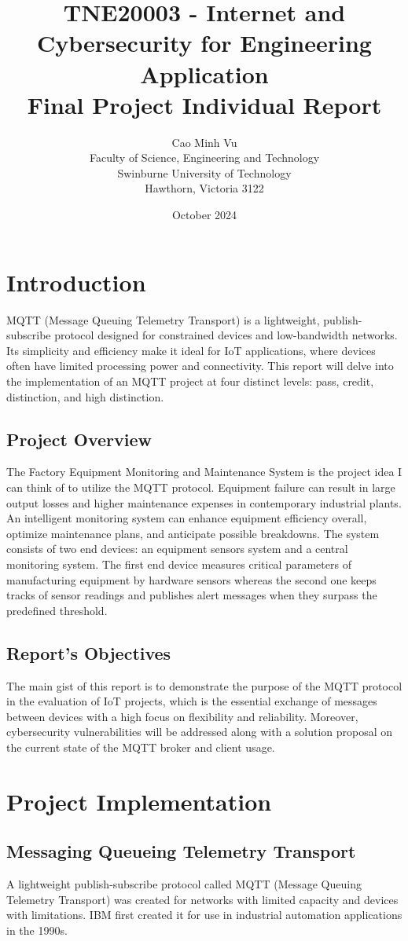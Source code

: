 \documentclass[a4paper, 12pt]{article}
\title{TNE20003 - Internet and Cybersecurity for Engineering Application\\ Final Project Individual Report}
\author{Cao Minh Vu \\ Faculty of Science, Engineering and Technology \\ Swinburne University of Technology \\ Hawthorn, Victoria 3122}
\date{October 2024}
\begin{document}
\maketitle
\newpage
\tableofcontents
\newpage
\section{Introduction}
    MQTT (Message Queuing Telemetry Transport) is a lightweight, publish-subscribe protocol designed for constrained devices and low-bandwidth networks. Its simplicity and efficiency make it ideal for IoT applications, where devices often have limited processing power and connectivity. This report will delve into the implementation of an MQTT project at four distinct levels: pass, credit, distinction, and high distinction.
\subsection{Project Overview}
    The Factory Equipment Monitoring and Maintenance System is the project idea I can think of to utilize the MQTT protocol. Equipment failure can result in large output losses and higher maintenance expenses in contemporary industrial plants. An intelligent monitoring system can enhance equipment efficiency overall, optimize maintenance plans, and anticipate possible breakdowns. The system consists of two end devices: an equipment sensors system and a central monitoring system. The first end device measures critical parameters of manufacturing equipment by hardware sensors whereas the second one keeps tracks of sensor readings and publishes alert messages when they surpass the predefined threshold.

\subsection{Report's Objectives}
    The main gist of this report is to demonstrate the purpose of the MQTT protocol in the evaluation of IoT projects, which is the essential exchange of messages between devices with a high focus on flexibility and reliability. Moreover, cybersecurity vulnerabilities will be addressed along with a solution proposal on the current state of the MQTT broker and client usage.
\section{Project Implementation}
\subsection {Messaging Queueing Telemetry Transport}
    A lightweight publish-subscribe protocol called MQTT (Message Queuing Telemetry Transport) was created for networks with limited capacity and devices with limitations. IBM first created it for use in industrial automation applications in the 1990s.
    
\end{document}
